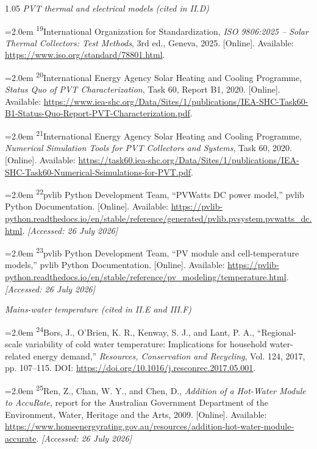 \documentclass[12pt,letterpaper]{article}
\DeclareRobustCommand{\refanchor}[1]{\hypertarget{ref:#1}{#1}} %
\newcommand{\referenceheading}[1]{\vspace{1.55em}\textit{#1}\par\vspace{0.45em}}
\newcommand{\refentry}[1]{\hangindent=2.0em\hangafter=1 #1\par\vspace{0.2em}}
\begin{document}
\begin{spacing}{1.05}
\referenceheading{PVT thermal and electrical models (cited in II.D)}

\refentry{
\textsuperscript{\refanchor{19}}International Organization for Standardization, \textit{ISO 9806:2025 -- Solar Thermal Collectors: Test Methods}, 3rd ed., Geneva, 2025. [Online]. Available: \url{https://www.iso.org/standard/78801.html}.
}

\refentry{
\textsuperscript{\refanchor{20}}International Energy Agency Solar Heating and Cooling Programme, \textit{Status Quo of PVT Characterization}, Task 60, Report B1, 2020. [Online]. Available: \url{https://www.iea-shc.org/Data/Sites/1/publications/IEA-SHC-Task60-B1-Status-Quo-Report-PVT-Characterization.pdf}.
}

\refentry{
\textsuperscript{\refanchor{21}}International Energy Agency Solar Heating and Cooling Programme, \textit{Numerical Simulation Tools for PVT Collectors and Systems}, Task 60, 2020. [Online]. Available: \url{https://task60.iea-shc.org/Data/Sites/1/publications/IEA-SHC-Task60-Numerical-Ssimulations-for-PVT.pdf}.
}

\refentry{
\textsuperscript{\refanchor{22}}pvlib Python Development Team, ``PVWatts DC power model,'' pvlib Python Documentation. [Online]. Available: \url{https://pvlib-python.readthedocs.io/en/stable/reference/generated/pvlib.pvsystem.pvwatts_dc.html}. \textit{[Accessed: 26 July 2026]}
}

\refentry{
\textsuperscript{\refanchor{23}}pvlib Python Development Team, ``PV module and cell-temperature models,'' pvlib Python Documentation. [Online]. Available: \url{https://pvlib-python.readthedocs.io/en/stable/reference/pv_modeling/temperature.html}. \textit{[Accessed: 26 July 2026]}
}

\referenceheading{Mains-water temperature (cited in II.E and III.F)}

\refentry{
\textsuperscript{\refanchor{24}}Bors, J., O'Brien, K. R., Kenway, S. J., and Lant, P. A., ``Regional-scale variability of cold water temperature: Implications for household water-related energy demand,'' \textit{Resources, Conservation and Recycling}, Vol. 124, 2017, pp. 107--115. DOI: \url{https://doi.org/10.1016/j.resconrec.2017.05.001}.
}

\refentry{
\textsuperscript{\refanchor{25}}Ren, Z., Chan, W. Y., and Chen, D., \textit{Addition of a Hot-Water Module to AccuRate}, report for the Australian Government Department of the Environment, Water, Heritage and the Arts, 2009. [Online]. Available: \url{https://www.homeenergyrating.gov.au/resources/addition-hot-water-module-accurate}. \textit{[Accessed: 26 July 2026]}
}


\end{spacing}
\end{document}
